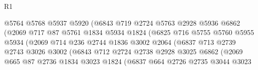 \begin{lexlean}{R1}
\begin{coremodule}
                                @5764
                                @5768
                                @5937
                                @5920
                                (@6843
                                  @719
                                  @2724
                                  @5763
                                  @2928
                                  @5936
                                  @6862
                                  (@2069
                                    @717
                                    @87
                                    @5761
                                    @1834
                                    @5934
                                    @1824
                                    (@6825
                                      @716
                                      @5755
                                      @5760
                                      @5955
                                      @5934
                                      (@2069
                                        @714
                                        @236
                                        @2744
                                        @1836
                                        @3002
                                        @2064
                                        (@6837
                                          @713
                                          @2739
                                          @2743
                                          @3026
                                          @3002
                                          (@6843
                                            @712
                                            @2724
                                            @2738
                                            @2928
                                            @3025
                                            @6862
                                            (@2069
                                              @665
                                              @87
                                              @2736
                                              @1834
                                              @3023
                                              @1824
                                              (@6837
                                                @664
                                                @2726
                                                @2735
                                                @3044
                                                @3023

\end{coremodule}
\end{lexlean}
